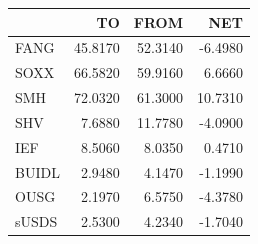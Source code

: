 \begin{tabular}{lrrr}
\toprule
 & TO & FROM & NET \\
\midrule
FANG & 45.8170 & 52.3140 & -6.4980 \\
SOXX & 66.5820 & 59.9160 & 6.6660 \\
SMH & 72.0320 & 61.3000 & 10.7310 \\
SHV & 7.6880 & 11.7780 & -4.0900 \\
IEF & 8.5060 & 8.0350 & 0.4710 \\
BUIDL & 2.9480 & 4.1470 & -1.1990 \\
OUSG & 2.1970 & 6.5750 & -4.3780 \\
sUSDS & 2.5300 & 4.2340 & -1.7040 \\
\bottomrule
\end{tabular}
